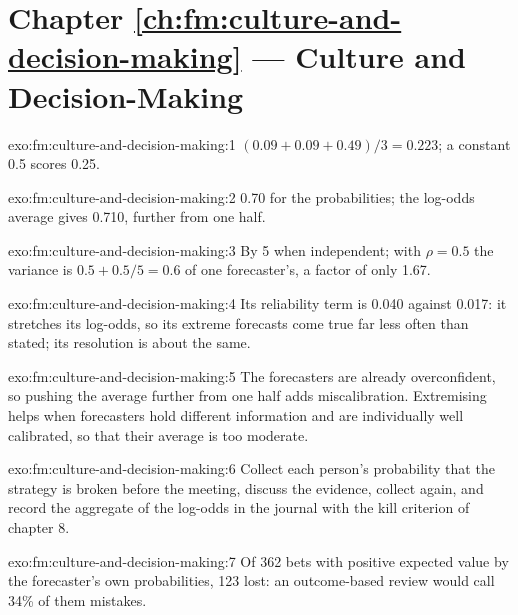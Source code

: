 \section*{Chapter \ref{ch:fm:culture-and-decision-making} --- Culture and Decision-Making}

\begin{solution}{exo:fm:culture-and-decision-making:1}
$(0.09+0.09+0.49)/3=0.223$; a constant 0.5 scores 0.25.
\end{solution}

\begin{solution}{exo:fm:culture-and-decision-making:2}
0.70 for the probabilities; the log-odds average gives 0.710, further from one half.
\end{solution}

\begin{solution}{exo:fm:culture-and-decision-making:3}
By 5 when independent; with $\rho=0.5$ the variance is $0.5+0.5/5=0.6$ of one forecaster's, a factor of only 1.67.
\end{solution}

\begin{solution}{exo:fm:culture-and-decision-making:4}
Its reliability term is 0.040 against 0.017: it stretches its log-odds, so its extreme forecasts come true far less often than stated; its resolution
is about the same.
\end{solution}

\begin{solution}{exo:fm:culture-and-decision-making:5}
The forecasters are already overconfident, so pushing the average further from one half adds miscalibration. Extremising helps when forecasters
hold different information and are individually well calibrated, so that their average is too moderate.
\end{solution}

\begin{solution}{exo:fm:culture-and-decision-making:6}
Collect each person's probability that the strategy is broken before the meeting, discuss the evidence, collect again, and record the aggregate
of the log-odds in the journal with the kill criterion of chapter 8.
\end{solution}

\begin{solution}{exo:fm:culture-and-decision-making:7}
Of 362 bets with positive expected value by the forecaster's own probabilities, 123 lost: an outcome-based review would call 34\% of them mistakes.
\end{solution}

